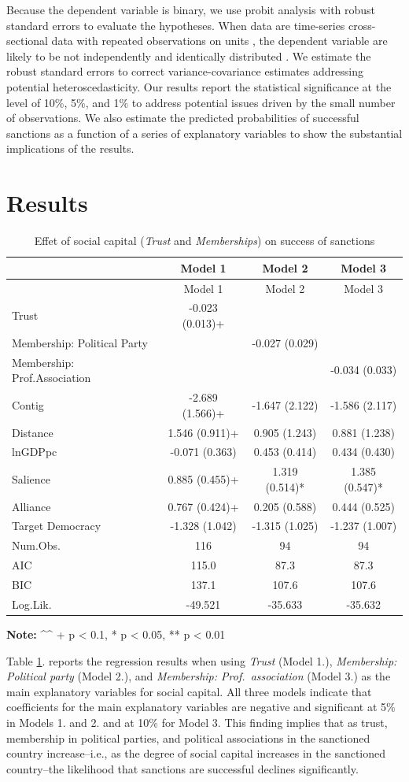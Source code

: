 \documentclass[12pt,]{article}
\begin{document}
Because the dependent variable is binary, we use probit analysis with
robust standard errors to evaluate the hypotheses. When data are
time-series cross-sectional data with repeated observations on units
\citep{stimson1985a}, the dependent variable are likely to be not
independently and identically distributed \citep{King2001a, Zorn2006a}.
We estimate the robust standard errors to correct variance-covariance
estimates addressing potential heteroscedasticity. Our results report
the statistical significance at the level of 10\%, 5\%, and 1\% to
address potential issues driven by the small number of observations. We
also estimate the predicted probabilities of successful sanctions as a
function of a series of explanatory variables to show the substantial
implications of the results.

\hypertarget{results}{%
\section{Results}\label{results}}

\begin{longtable}[]{@{}lccc@{}}
\caption{\label{tab1} Effet of social capital (\emph{Trust} and
\emph{Memberships}) on success of sanctions}\tabularnewline
\toprule
& Model 1 & Model 2 & Model 3\tabularnewline
\midrule
\endfirsthead
\toprule
& Model 1 & Model 2 & Model 3\tabularnewline
\midrule
\endhead
Trust & -0.023 (0.013)+ & &\tabularnewline
Membership: Political Party & & -0.027 (0.029) &\tabularnewline
Membership: Prof.Association & & & -0.034 (0.033)\tabularnewline
Contig & -2.689 (1.566)+ & -1.647 (2.122) & -1.586
(2.117)\tabularnewline
Distance & 1.546 (0.911)+ & 0.905 (1.243) & 0.881 (1.238)\tabularnewline
lnGDPpc & -0.071 (0.363) & 0.453 (0.414) & 0.434 (0.430)\tabularnewline
Salience & 0.885 (0.455)+ & 1.319 (0.514)* & 1.385
(0.547)*\tabularnewline
Alliance & 0.767 (0.424)+ & 0.205 (0.588) & 0.444 (0.525)\tabularnewline
Target Democracy & -1.328 (1.042) & -1.315 (1.025) & -1.237
(1.007)\tabularnewline
Num.Obs. & 116 & 94 & 94\tabularnewline
AIC & 115.0 & 87.3 & 87.3\tabularnewline
BIC & 137.1 & 107.6 & 107.6\tabularnewline
Log.Lik. & -49.521 & -35.633 & -35.632\tabularnewline
\bottomrule
\end{longtable}

\textbf{Note:} \^{}\^{} + p \textless{} 0.1, * p \textless{} 0.05, ** p
\textless{} 0.01

Table \ref{tab1}. reports the regression results when using \emph{Trust}
(Model 1.), \emph{Membership: Political party} (Model 2.), and
\emph{Membership: Prof.~association} (Model 3.) as the main explanatory
variables for social capital. All three models indicate that
coefficients for the main explanatory variables are negative and
significant at 5\% in Models 1. and 2. and at 10\% for Model 3. This
finding implies that as trust, membership in political parties, and
political associations in the sanctioned country increase--i.e., as the
degree of social capital increases in the sanctioned country--the
likelihood that sanctions are successful declines significantly.
\end{document}
